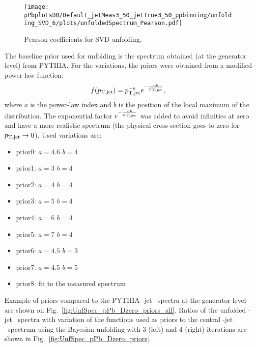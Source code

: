 \begin{figure}[bth]
\centering
\texttt{[image: pPbplotsD0/Default\_jetMeas3\_50\_jetTrue3\_50\_ppbinning/unfolding\_SVD\_6/plots/unfoldedSpectrum\_Pearson.pdf]}
\caption{Pearson coefficients for SVD unfolding.}
\label{fig:unfPearson_pPb_Dzero_SVD}
\end{figure}


The baseline prior used for unfolding is the spectrum obtained (at the generator level) from PYTHIA.
For the variations, the priors were obtained from a modified power-law function:
\begin{equation}
f(p_{\mathrm{T,jet}}) = p_{\mathrm{T,jet}}^{-a}e^{-\frac{ab}{p_{\mathrm{T,jet}}}},
\end{equation}
where $a$ is the power-law index and $b$ is the position of the local maximum of the distribution. The exponential factor $e^{-\frac{ab}{p_{\mathrm{T,jet}}}}$ was added to avoid infinities at zero and have a more realistic spectrum (the physical cross-section goes to zero for $p_{\mathrm{T,jet}} \to 0$).
Used variations are: %
\begin{itemize}
\item prior0: $a=4.6$ $b=4$~\GeVc\ 
\item prior1: $a=3$ $b=4$~\GeVc\
\item prior2: $a=4$ $b=4$~\GeVc\
\item prior3: $a=5$ $b=4$~\GeVc\
\item prior4: $a=6$ $b=4$~\GeVc\
\item prior5: $a=7$ $b=4$~\GeVc\
\item prior6: $a=4.5$ $b=3$~\GeVc\
\item prior7: $a=4.5$ $b=5$~\GeVc\
\item prior8: fit to the measured spectrum
\end{itemize}

Example of priors compared to the PYTHIA \Dzero-jet \pt\ spectra at the generator level are shown on Fig.~\ref{fig:UnfSpec_pPb_Dzero_priors_all}.
Ratios of the unfolded \Dzero-jet \pt\ spectra with variation of the functions used as priors to the central \Dzero-jet \pt\ spectrum using the Bayesian unfolding with 3 (left) and 4 (right) iterations are shown in Fig.~\ref{fig:UnfSpec_pPb_Dzero_priors}. 

